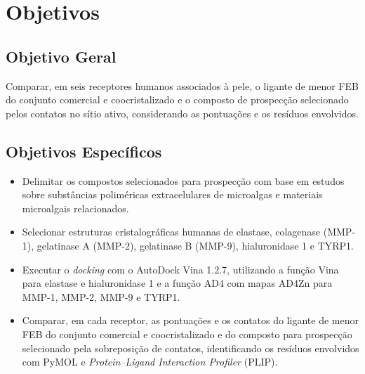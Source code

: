 \section{Objetivos}
\subsection{Objetivo Geral}
Comparar, em seis receptores humanos associados à pele, o ligante de menor FEB do conjunto comercial e coocristalizado e o composto de prospecção selecionado pelos contatos no sítio ativo, considerando as pontuações e os resíduos envolvidos.

\subsection{Objetivos Específicos}
\begin{itemize}
\item Delimitar os compostos selecionados para prospecção com base em estudos sobre substâncias poliméricas extracelulares de microalgas e materiais microalgais relacionados.
\item Selecionar estruturas cristalográficas humanas de elastase, colagenase (MMP-1), gelatinase A (MMP-2), gelatinase B (MMP-9), hialuronidase 1 e TYRP1.
\item Executar o \textit{docking} com o AutoDock Vina 1.2.7, utilizando a função Vina para elastase e hialuronidase 1 e a função AD4 com mapas AD4Zn para MMP-1, MMP-2, MMP-9 e TYRP1.
\item Comparar, em cada receptor, as pontuações e os contatos do ligante de menor FEB do conjunto comercial e coocristalizado e do composto para prospecção selecionado pela sobreposição de contatos, identificando os resíduos envolvidos com PyMOL e \textit{Protein--Ligand Interaction Profiler} (PLIP).
\end{itemize}
